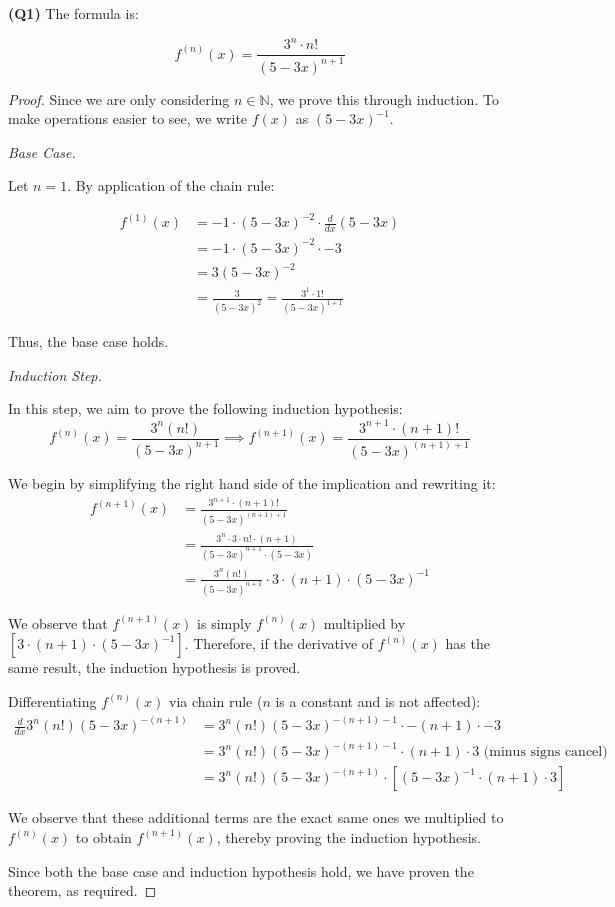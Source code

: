 \documentclass[12pt, a4paper]{article}
\newcommand{\N}{\mathbb{N}}
\newcommand{\ddx}{\frac{d}{dx}}
\begin{document}
\textbf{(Q1)}
The formula is:

\[
    \displaystyle f^{(n)}(x) = \frac{3^n \cdot n!}{(5 - 3x)^{n + 1}}
\]

\begin{proof}
    Since we are only considering $n \in \N$, we prove this through induction. To make
    operations easier to see, we write $f(x)$ as $(5 - 3x)^{-1}$.

    \textit{Base Case.}

    Let $n = 1$. By application of the chain rule:

    \begin{align*}
        f^{(1)}(x) & = -1 \cdot (5 - 3x)^{-2} \cdot \ddx(5 - 3x)\\
        & = -1 \cdot (5 - 3x)^{-2} \cdot -3\\
        & = 3(5 - 3x)^{-2}\\
        & = \frac{3}{(5 - 3x)^2} = \frac{3^1 \cdot 1!}{(5 - 3x)^{1 + 1}}
    \end{align*}

    Thus, the base case holds.

    \textit{Induction Step.}

    In this step, we aim to prove the following induction hypothesis:
    \[
        f^{(n)}(x) = \frac{3^n(n!)}{(5 - 3x)^{n + 1}}
        \implies f^{(n + 1)}(x) = \frac{3^{n + 1} \cdot (n + 1)!}{(5 - 3x)^{(n + 1) + 1}}
    \]

    We begin by simplifying the right hand side of the implication and rewriting it:
    \begin{align*}
        f^{(n + 1)}(x) & = \frac{3^{n + 1} \cdot (n + 1)!}{(5 - 3x)^{(n + 1) + 1}}\\
        & = \frac{3^n \cdot 3 \cdot n! \cdot (n + 1)}{(5 - 3x)^{n + 1} \cdot (5 - 3x)}\\
        & = \frac{3^n(n!)}{(5 - 3x)^{n + 1}} \cdot 3 \cdot (n + 1) \cdot (5 - 3x)^{-1}
    \end{align*}

    We observe that $f^{(n + 1)}(x)$ is simply $f^{(n)}(x)$ multiplied by
    $\left[3 \cdot (n + 1) \cdot (5 - 3x)^{-1}\right]$. Therefore, if the derivative
    of $f^{(n)}(x)$ has the same result, the induction hypothesis is proved.

    Differentiating $f^{(n)}(x)$ via chain rule ($n$ is a constant and is not affected):
    \begin{align*}
        \ddx 3^n(n!)(5 - 3x)^{-(n + 1)} & = 
        3^n(n!)(5 - 3x)^{-(n + 1) - 1} \cdot -(n + 1) \cdot -3\\
        & = 3^n(n!)(5 - 3x)^{-(n + 1) - 1} \cdot (n + 1) \cdot 3 
        \text{ (minus signs cancel)}\\
        & = 3^n(n!)(5 - 3x)^{-(n + 1) } \cdot 
        \left[(5 - 3x)^{-1} \cdot (n + 1) \cdot 3\right]
    \end{align*}

    We observe that these additional terms are the exact same ones we multiplied to $f^{(n)}(x)$ 
    to obtain $f^{(n + 1)}(x)$, thereby proving the induction hypothesis.

    Since both the base case and induction hypothesis hold, we have proven the theorem, as required.
\end{proof}
\end{document}
